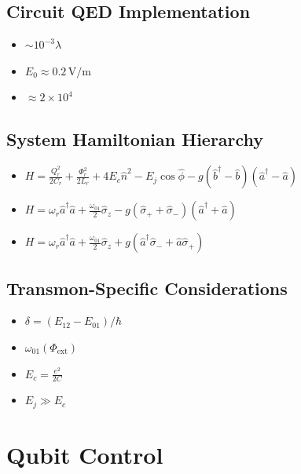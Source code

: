 \documentclass{article}
\begin{document}
\subsection*{Circuit QED Implementation}
\begin{itemize}
    \item $\sim 10^{-3}\lambda$
    \item $E_0 \approx 0.2\,\text{V/m}$
    \item $\approx 2 \times 10^4$
\end{itemize}

\subsection*{System Hamiltonian Hierarchy}
\begin{itemize}
    \item $H = \frac{Q_r^2}{2C_r} + \frac{\Phi_r^2}{2L_r} + 4E_c \hat{n}^2 - E_j \cos \hat{\phi} - g(\hat{b}^\dagger - \hat{b})(\hat{a}^\dagger - \hat{a})$
    \item $H = \omega_r \hat{a}^\dagger \hat{a} + \frac{\omega_{01}}{2} \hat{\sigma}_z - g(\hat{\sigma}_+ + \hat{\sigma}_-)(\hat{a}^\dagger + \hat{a})$
    \item $H = \omega_r \hat{a}^\dagger \hat{a} + \frac{\omega_{01}}{2} \hat{\sigma}_z + g(\hat{a}^\dagger \hat{\sigma}_- + \hat{a} \hat{\sigma}_+)$
\end{itemize}

\subsection*{Transmon-Specific Considerations}
\begin{itemize}
    \item $\delta = (E_{12} - E_{01})/\hbar$
    \item $\omega_{01}(\Phi_{\text{ext}})$
    \item $E_c = \frac{e^2}{2C}$
    \item $E_j \gg E_c$
\end{itemize}

\newpage
\section{Qubit Control}
\end{document}
